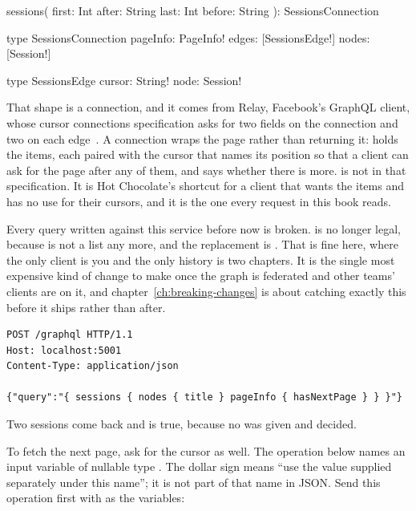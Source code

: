 \begin{graphqlsdl}
sessions(
  first: Int
  after: String
  last: Int
  before: String
): SessionsConnection

type SessionsConnection {
  pageInfo: PageInfo!
  edges: [SessionsEdge!]
  nodes: [Session!]
}

type SessionsEdge {
  cursor: String!
  node: Session!
}
\end{graphqlsdl}

%
%
That shape is a connection, and it comes from Relay, Facebook's GraphQL
client, whose cursor connections specification asks for two fields on the
connection and two on each edge~\autocite{relayconnections}. A connection
wraps the page rather than returning it:  holds the items, each
paired with the cursor that names its position so that a client can ask for
the page after any of them, and  says whether there is more.
 is not in that specification. It is Hot Chocolate's shortcut for
a client that wants the items and has no use for their cursors, and it is the
one every request in this book reads.

%
Every query written against this service before now is broken.  is no longer legal, because  is not a list any
more, and the replacement is . That is
fine here, where the only client is you and the only history is two chapters.
It is the single most expensive kind of change to make once the graph is
federated and other teams' clients are on it, and
chapter~\ref{ch:breaking-changes} is about catching exactly this before it
ships rather than after.

\begin{verbatim}
POST /graphql HTTP/1.1
Host: localhost:5001
Content-Type: application/json

{"query":"{ sessions { nodes { title } pageInfo { hasNextPage } } }"}
\end{verbatim}

Two sessions come back and  is true, because no 
was given and  decided.

To fetch the next page, ask for the cursor as well. The operation below
names an input variable  of nullable type .
The dollar sign means \enquote{use the value supplied separately under this
name}; it is not part of that name in JSON. Send this operation first
with  as the variables:

